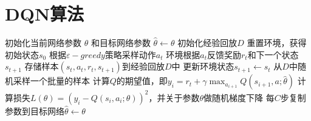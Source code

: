 \documentclass[11pt]{ctexart}
\begin{document}
\section{DQN算法}
\begin{algorithm}[H] %
    \renewcommand{\thealgorithm}{} %
	\caption{} 
    \renewcommand{\algorithmicrequire}{\textbf{输入:}}  
    \renewcommand{\algorithmicensure}{\textbf{输出:}} 
	\begin{algorithmic}[1]
		\STATE 初始化当前网络参数 $\theta$ 和目标网络参数 $\hat{\theta} \leftarrow \theta$
		\STATE 初始化经验回放$D$
			\STATE 重置环境，获得初始状态$s_0$
				\STATE 根据$\varepsilon-greedy$策略采样动作$a_t$
				\STATE 环境根据$a_t$反馈奖励$r_t$和下一个状态$s_{t+1}$
				\STATE 存储样本$(s_t,a_t,r_t,s_{t+1})$到经验回放$D$中
				\STATE 更新环境状态$s_{t+1} \leftarrow s_t$
				\STATE 从$D$中随机采样一个批量的样本
				\STATE 计算$Q$的期望值，即$y_{i}=r_t+\gamma\max _{a_{i+1}}Q(s_{i+1},a;\hat{\theta})$
				\STATE 计算损失$L(\theta)=\left(y_{i}-Q\left(s_{i}, a_{i} ; \theta\right)\right)^{2}$，并关于参数$\theta$做随机梯度下降
				\STATE 每$C$步复制参数到目标网络$\hat{\theta} \leftarrow \theta$
			\ENDFOR
		\ENDFOR
	\end{algorithmic}
\end{algorithm}

\clearpage
\end{document}
